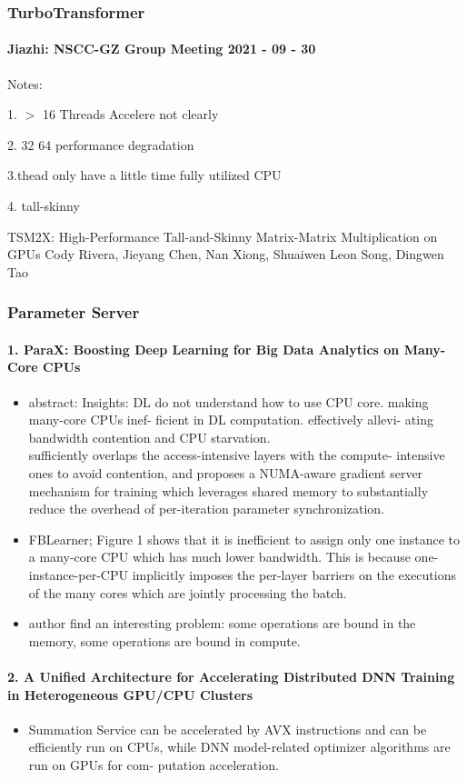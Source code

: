 \documentclass[UTF8]{article}
\begin{document}
\subsubsection{TurboTransformer}
\paragraph{Jiazhi: NSCC-GZ Group Meeting 2021 - 09 - 30}
Notes:

1. $>$ 16 Threads Accelere not clearly 

2. 32 64 performance degradation 

3.thead only have a little time fully utilized CPU

4. tall-skinny

TSM2X: High-Performance Tall-and-Skinny Matrix-Matrix Multiplication on GPUs
Cody Rivera, Jieyang Chen, Nan Xiong, Shuaiwen Leon Song, Dingwen Tao

 
\subsubsection{Parameter Server}
\paragraph{1. ParaX: Boosting Deep Learning for Big Data Analytics on Many-Core CPUs}
\begin{itemize}
	\item abstract: Insights: DL do not understand how to use CPU core. making many-core CPUs inef- ficient in DL computation.  effectively allevi- ating bandwidth contention and CPU starvation.\\ sufficiently overlaps the access-intensive layers with the compute- intensive ones to avoid contention, and proposes a NUMA-aware gradient server mechanism for training which leverages shared memory to substantially reduce the overhead of per-iteration parameter synchronization. 
	\item FBLearner; Figure 1 shows that it is inefficient to assign only one instance to a many-core CPU which has much lower bandwidth. This is because one-instance-per-CPU implicitly imposes the per-layer barriers on the executions of the many cores which are jointly processing the batch.
	\item author find an interesting problem: some operations are bound in the memory, some operations are bound in compute.  
\end{itemize}
\paragraph{2. A Unified Architecture for Accelerating Distributed DNN Training in Heterogeneous GPU/CPU Clusters}
\begin{itemize}
	\item Summation Service can be accelerated by AVX instructions and can be efficiently run on CPUs, while DNN model-related optimizer algorithms are run on GPUs for com- putation acceleration.
\end{itemize}
\end{document}
